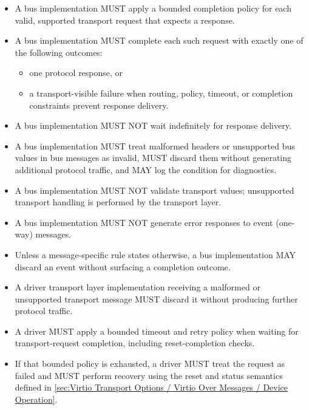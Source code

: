 \begin{itemize}
  \item A bus implementation MUST apply a bounded completion policy for each
        valid, supported transport request that expects a response.
  \item A bus implementation MUST complete each such request with exactly one
        of the following outcomes:
    \begin{itemize}
      \item one protocol response, or
      \item a transport-visible failure when routing, policy, timeout, or
            completion constraints prevent response delivery.
    \end{itemize}
  \item A bus implementation MUST NOT wait indefinitely for response delivery.
  \item A bus implementation MUST treat malformed headers or unsupported bus
         values in bus messages as invalid, MUST discard them
        without generating additional protocol traffic, and MAY log the
        condition for diagnostics.
  \item A bus implementation MUST NOT validate transport  values;
        unsupported transport  handling is performed by the
        transport layer.
  \item A bus implementation MUST NOT generate error responses to event
        (one-way) messages.
  \item Unless a message-specific rule states otherwise, a bus implementation
        MAY discard an event without surfacing a completion outcome.
\end{itemize}

\begin{itemize}
  \item A driver transport layer implementation receiving a malformed or
        unsupported transport message MUST discard it without producing further
        protocol traffic.
  \item A driver MUST apply a bounded timeout and retry policy when waiting for
        transport-request completion, including reset-completion checks.
  \item If that bounded policy is exhausted, a driver MUST treat the request as
        failed and MUST perform recovery using the reset and status semantics
        defined in
        \ref{sec:Virtio Transport Options / Virtio Over Messages / Device Operation}.
\end{itemize}

